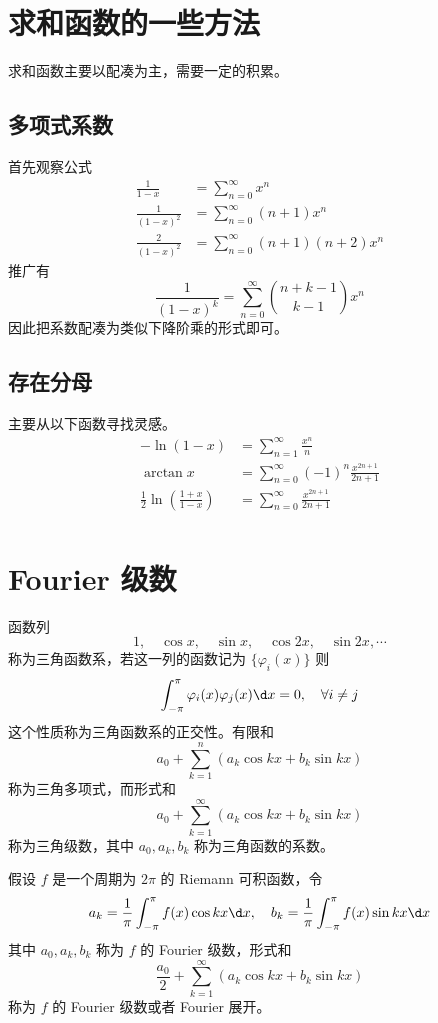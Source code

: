 \section{求和函数的一些方法}

求和函数主要以配凑为主，需要一定的积累。

\subsection{多项式系数}

首先观察公式
\[ \begin{aligned}
		\frac{1}{1 - x}     & = \sum_{n=0}^{\infty} x^n             \\
		\frac{1}{(1 - x)^2} & = \sum_{n=0}^{\infty} (n+1) x^n       \\
		\frac{2}{(1 - x)^2} & = \sum_{n=0}^{\infty} (n+1)(n+2) x^n
	\end{aligned} \]
推广有
\[ \frac{1}{(1-x)^k} = \sum_{n=0}^{\infty} \binom{n+k-1}{k-1} x^n \]
因此把系数配凑为类似下降阶乘的形式即可。

\subsection{存在分母}

主要从以下函数寻找灵感。
\[ \begin{aligned}
		- \ln(1-x) & = \sum_{n=1}^{\infty} \frac{x^n}{n}               \\
		\arctan x  & = \sum_{n=0}^{\infty} (-1)^n\frac{x^{2n+1}}{2n+1} \\
		\frac{1}{2}\ln\left(\frac{1+x}{1-x}\right)  & = \sum_{n=0}^{\infty} \frac{x^{2n+1}}{2n+1} \\
	\end{aligned} \]

\section{Fourier 级数}

函数列
\[ 1, \quad \cos x, \quad \sin x, \quad \cos 2x, \quad \sin 2x , \cdots \]
称为三角函数系，若这一列的函数记为 $\{\varphi_i(x)\}$ 则
\[ \int_{-\pi}^{\pi} \varphi_i(x) \varphi_j(x) \d x = 0, \quad \forall i \neq j \]
这个性质称为三角函数系的正交性。有限和
\[ a_0 + \sum_{k=1}^n (a_k \cos kx + b_k \sin kx) \]
称为三角多项式，而形式和
\[ a_0 + \sum_{k=1}^\infty (a_k \cos kx + b_k \sin kx) \]
称为三角级数，其中 $a_0, a_k, b_k$ 称为三角函数的系数。

\begin{definition}
	假设 $f$ 是一个周期为 $2\pi$ 的 Riemann 可积函数，令
	\[ a_k = \frac{1}{\pi} \int_{-\pi}^{\pi} f(x) \cos kx \d x, \quad b_k = \frac{1}{\pi} \int_{-\pi}^{\pi} f(x) \sin k x \d x \]
	其中 $a_0, a_k, b_k$ 称为 $f$ 的 Fourier 级数，形式和
	\[ \frac{a_0}{2} + \sum_{k=1}^\infty (a_k \cos k x+ b_k \sin k x) \]
	称为 $f$ 的 Fourier 级数或者 Fourier 展开。
\end{definition}


